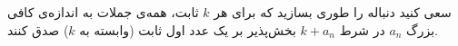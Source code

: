 سعی کنید دنباله را طوری بسازید که برای هر $k$ ثابت، همه‌ی جملات به اندازه‌ی کافی بزرگ $a_n$ در شرط $k + a_n$ بخش‌پذیر بر یک عدد اول ثابت (وابسته به $k$) صدق کنند.
